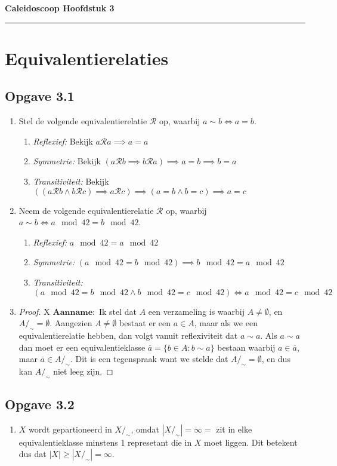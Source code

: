 \documentclass{article}
\begin{document}
\begin{center}
    \Large \textbf{Caleidoscoop Hoofdstuk 3}
\end{center}

\rule{\textwidth}{2pt}

\bigskip

\section{Equivalentierelaties}

\subsection*{Opgave 3.1}
\begin{enumerate}[label=\alph*)]
    \item 
        Stel de volgende equivalentierelatie $\mathcal{R}$ op, waarbij $a \sim b \Longleftrightarrow a = b$.
        \begin{enumerate}[label=\arabic*]
            \item \emph{Reflexief:} Bekijk $a \mathcal{R} a \implies a = a$
            \item \emph{Symmetrie:} Bekijk $(a \mathcal{R} b \implies b \mathcal{R} a) \implies a = b \implies b = a$ 
            \item \emph{Transitiviteit:} Bekijk $((a \mathcal{R} b \wedge b \mathcal{R} c) \implies a \mathcal{R}c) \implies (a = b \wedge b = c) \implies a = c$
        \end{enumerate}
    \item
        Neem de volgende equivalentierelatie $\mathcal{R}$ op, waarbij $a \sim b \Longleftrightarrow a \mod 42 = b \mod 42$.
        \begin{enumerate}[label=\arabic*]
            \item \emph{Reflexief:} $a \mod 42 = a \mod 42$
            \item \emph{Symmetrie:} $(a \mod 42 = b \mod 42) \implies b \mod 42 = a \mod 42$ 
            \item \emph{Transitiviteit:} $(a \mod 42 = b \mod 42 \wedge b \mod 42 = c \mod 42) \Longleftrightarrow a \mod 42 = c \mod 42$
        \end{enumerate}
    \item 
    \begin{proof}X
        $\mathbf{Aanname:}$ Ik stel dat $A$ een verzameling is waarbij $A \neq \emptyset$, en $A/_\sim = \emptyset$. 
        Aangezien $A \neq \emptyset$ bestaat er een $a \in A$, maar als we een equivalentierelatie hebben, dan volgt vanuit reflexiviteit dat $a \sim a$.
        Als $a \sim a$ dan moet er een equivalentieklasse $\overline{a} = \{b \in A : b \sim a\}$ bestaan waarbij $a \in \overline{a}$, maar $\overline{a} \in A/_\sim$. 
        Dit is een tegenspraak want we stelde dat $A/_\sim = \emptyset$, en dus kan $A/_\sim$ niet leeg zijn.
    \end{proof}
\end{enumerate}
\subsection*{Opgave 3.2}
\begin{enumerate}[label=\alph*)]
    \item $X$ wordt gepartioneerd in $X/_\sim$, omdat $|X/_\sim| = \infty =$ zit in elke equivalentieklasse minstens 1 represetant die in $X$ moet liggen. Dit betekent dus dat $|X| \geq |X/_\sim| = \infty$.
\end{enumerate}
\end{document}
